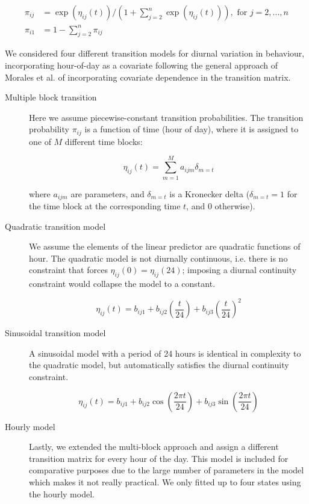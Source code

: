 \documentclass{bmcart}
\begin{document}
\begin{equation}
\begin{split}
\pi_{ij} & = \exp(\eta_{ij}(t))/\left(1+\sum_{j=2}^{n}\exp(\eta_{ij}(t))\right), \textrm{ for } j={2,...,n} \\
\pi_{i1} & = 1 - \sum_{j=2}^{n}\pi_{ij}
\end{split}
\end{equation}

We considered four different transition models for diurnal variation in behaviour, incorporating hour-of-day as a covariate following the general approach of Morales et al.\cite{morales_extracting_2004} of incorporating covariate dependence in the transition matrix.

\begin{description}

\item[Multiple block transition] Here we assume piecewise-constant transition probabilities. The transition probability $\pi_{ij}$ is a function of time (hour of day), where it is assigned to one of $M$ different time blocks:

$$
\eta_{ij}(t) = \sum_{m=1}^{M}a_{ijm} \delta_{m=t}
$$

where $a_{ijm}$ are parameters, and $\delta_{m=t}$ is a Kronecker delta ($\delta_{m=t}=1$ for the time block at the corresponding time $t$, and 0 otherwise). 

\item[Quadratic transition model] 
We assume the elements of the linear predictor
are quadratic functions of hour. The quadratic model is not diurnally continuous, i.e. there 
is no constraint that forces $\eta_{ij}(0)=\eta_{ij}(24)$; imposing a diurnal continuity 
constraint would collapse the model to a constant.

$$
\eta_{ij}(t) = b_{ij1}+b_{ij2}\left(\frac{t}{24}\right)+b_{ij3}\left(\frac{t}{24}\right)^{2}
$$

\item[Sinusoidal transition model] A sinusoidal model with a period of 24 hours is identical in complexity to the quadratic model, but automatically satisfies the diurnal continuity constraint.

$$
\eta_{ij}(t)= b_{ij1}+b_{ij2}\cos\left(\frac{2\pi t}{24}\right)+b_{ij3}\sin\left(\frac{2\pi t}{24}\right)
$$

\item[Hourly model] Lastly, we extended the multi-block approach and assign  a different transition matrix for every hour of the day. This model is included for comparative purposes due to the large number of parameters in the model which makes it not really practical. We only fitted up to four states using the hourly model.  
\end{description}
\end{document}
